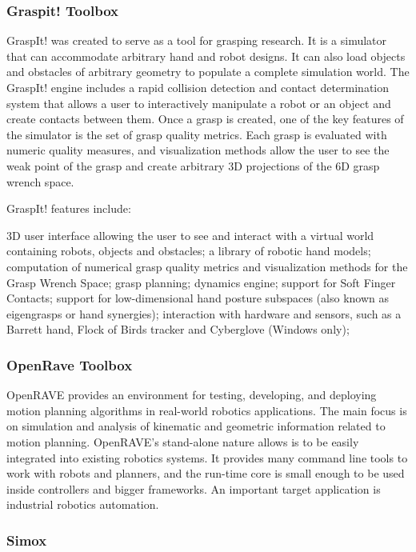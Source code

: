 \subsubsection{Graspit! Toolbox}
\par
GraspIt! was created to serve as a tool for grasping research. It is a simulator that can accommodate arbitrary hand and robot designs. It can also load objects and obstacles of arbitrary geometry to populate a complete simulation world. The GraspIt! engine includes a rapid collision detection and contact determination system that allows a user to interactively manipulate a robot or an object and create contacts between them. Once a grasp is created, one of the key features of the simulator is the set of grasp quality metrics. Each grasp is evaluated with numeric quality measures, and visualization methods allow the user to see the weak point of the grasp and create arbitrary 3D projections of the 6D grasp wrench space.

\par
GraspIt! features include:

    3D user interface allowing the user to see and interact with a virtual world containing robots, objects and obstacles;
    a library of robotic hand models;
    computation of numerical grasp quality metrics and visualization methods for the Grasp Wrench Space;
    grasp planning;
    dynamics engine;
    support for Soft Finger Contacts;
    support for low-dimensional hand posture subspaces (also known as eigengrasps or hand synergies);
    interaction with hardware and sensors, such as a Barrett hand, Flock of Birds tracker and Cyberglove (Windows only);
\par
\subsubsection{OpenRave Toolbox}
\par
OpenRAVE provides an environment for testing, developing, and deploying motion planning algorithms in real-world robotics applications. The main focus is on simulation and analysis of kinematic and geometric information related to motion planning. OpenRAVE's stand-alone nature allows is to be easily integrated into existing robotics systems. It provides many command line tools to work with robots and planners, and the run-time core is small enough to be used inside controllers and bigger frameworks. An important target application is industrial robotics automation.
\par
\subsubsection{Simox}


